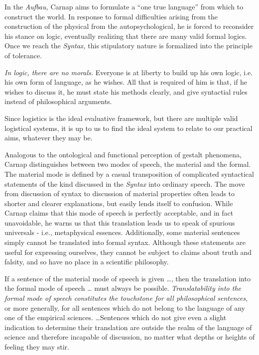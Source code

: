 \documentclass[leqno, 12pt]{turabian-researchpaper}
\begin{document}
	In the \textit{Aufbau,} Carnap aims to formulate a \enquote{one true language}
	from which to construct the world. In response to formal difficulties arising
	from the construction of the physical from the autopsychological, he is forced
	to reconsider his stance on logic, eventually realizing that there are many
	valid formal logics. Once we reach the \textit{Syntax,} this stipulatory
	nature is formalized into the principle of tolerance.
	\begin{displayquote}
		 \emph{In logic, there are no morals.}
		Everyone is at liberty to build up his own logic, i.e. his own form of
		language, as he wishes. All that is required of him is that, if he wishes to
		discuss it, he must state his methods clearly, and give syntactial rules instead
		of philosophical arguments.
	\end{displayquote}
	Since logistics is the ideal evaluative framework, but there are multiple
	valid logistical systems, it is up to us to find the ideal system to relate to
	our practical aims, whatever they may be.

	Analogous to the ontological and functional perception of gestalt phenomena, Carnap
	distinguishes between two modes of speech, the material and the formal. The material
	mode is defined by a casual transposition of complicated syntactical statements
	of the kind discussed in the \textit{Syntax} into ordinary speech. The move from
	discussion of syntax to discussion of material properties often leads to shorter
	and clearer explanations, but easily lends itself to confusion. While Carnap claims
	that this mode of speech is perfectly acceptable, and in fact unavoidable, he warns
	us that this translation leads us to speak of spurious universals - i.e., metaphysical
	essences. Additionally, some material sentences simply cannot be translated into
	formal syntax. Although these statements are useful for expressing ourselves, they
	cannot be subject to claims about truth and falsity, and so have no place in a
	scientific philosophy.

	\begin{displayquote}
		 If a sentence of the material mode of speech
		is given \dots, then the translation into the formal mode of speech \dots
		must always be possible. \emph{Translatability into the formal mode of
		speech constitutes the touchstone for all philosophical sentences}, or more generally,
		for all sentences which do not belong to the language of any one of the
		empirical sciences. \dots Sentences which do not give even a slight indication
		to determine their translation are outside the realm of the language of science
		and therefore incapable of discussion, no matter what depths or heights of
		feeling they may stir.
	\end{displayquote}
\end{document}
